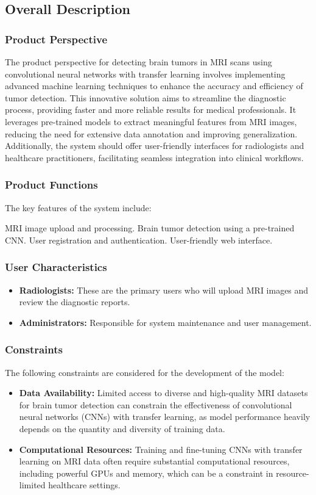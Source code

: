 \subsection{Overall Description}
\subsubsection{Product Perspective}
The product perspective for detecting brain tumors in MRI scans using convolutional neural networks with transfer learning involves implementing advanced machine learning techniques to enhance the accuracy and efficiency of tumor detection. This innovative solution aims to streamline the diagnostic process, providing faster and more reliable results for medical professionals. It leverages pre-trained models to extract meaningful features from MRI images, reducing the need for extensive data annotation and improving generalization. Additionally, the system should offer user-friendly interfaces for radiologists and healthcare practitioners, facilitating seamless integration into clinical workflows. 

\subsubsection{Product Functions}
The key features of the system include:

MRI image upload and processing.
Brain tumor detection using a pre-trained CNN.
User registration and authentication.
User-friendly web interface.


\subsubsection{User Characteristics}
\begin{itemize}
\item \textbf {Radiologists:} These are the primary users who will upload MRI images and review the diagnostic reports.
\item \textbf {Administrators:} Responsible for system maintenance and user management.
\end{itemize}
\subsubsection{Constraints}
The following constraints are considered for the development of the model:
\begin{itemize}
    \item \textbf{Data Availability:} Limited access to diverse and high-quality MRI datasets for brain tumor detection can constrain the effectiveness of convolutional neural networks (CNNs) with transfer learning, as model performance heavily depends on the quantity and diversity of training data.
    \item \textbf{Computational Resources:} Training and fine-tuning CNNs with transfer learning on MRI data often require substantial computational resources, including powerful GPUs and memory, which can be a constraint in resource-limited healthcare settings.
\end{itemize}


